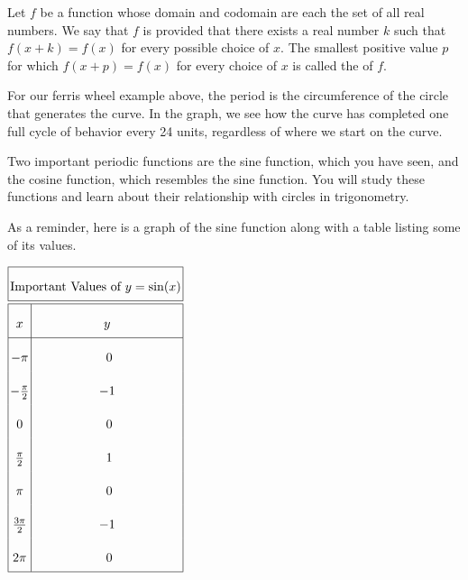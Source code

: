 \documentclass[nooutcomes]{ximera}
\begin{document}
\begin{definition}
Let $f$ be a function whose domain and codomain %
are each the set of all real numbers. We say that $f$ is  provided that there exists a real number $k$ such that $f(x + k) = f(x)$ for every possible choice of $x$. The smallest positive value $p$ for which $f(x + p) = f(x)$ for every choice of $x$ is called the  of $f$.

\end{definition}

For our ferris wheel example above, the period is the circumference of the circle that generates the curve. In the graph, we see how the curve has completed one full cycle of behavior every 24 units, regardless of where we start on the curve.

Two important periodic functions are the sine function, which you have seen, and the cosine function, which resembles the sine function. You will study these functions and learn about their relationship with circles in trigonometry.

As a reminder, here is a graph of the sine function along with a table listing some of its values.

\begin{image}
\end{image}

\begin{center}
$\arraycolsep=1.4pt\def\arraystretch{2.2}
\begin{array}{ |c|c|  }
 \hline
 \multicolumn{2}{|c|}{\text{\normalfont Important Values of }y=\sin(x)} \\
\hline
 \hline
 x & y\\
 \hline

 -\pi&\text{ }0\\

 -\frac{\pi}{2}&-1\\

 0&\text{ }0\\

 \frac{\pi}{2}&\text{ }1\\

 \pi&\text{ }0\\

\frac{3\pi}{2}&-1\\

 2 \pi&\text{ }0\\
\hline
\end{array}
$
\end{center} 
\end{document}
